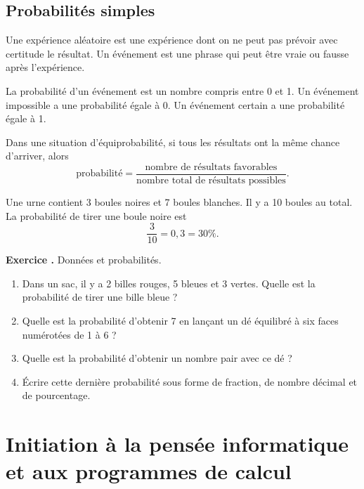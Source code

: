 \documentclass[11pt,a4paper]{article}
\newcounter{exo}
\newcommand{\exercice}[1]{\refstepcounter{exo}\begin{exobox}\textbf{Exercice \theexo.} #1\end{exobox}}
\begin{document}
\subsection{Probabilités simples}

\begin{definitionbox}
Une expérience aléatoire est une expérience dont on ne peut pas prévoir avec certitude le résultat. Un événement est une phrase qui peut être vraie ou fausse après l'expérience.
\end{definitionbox}

\begin{definitionbox}
La probabilité d'un événement est un nombre compris entre 0 et 1. Un événement impossible a une probabilité égale à 0. Un événement certain a une probabilité égale à 1.
\end{definitionbox}

\begin{proprbox}
Dans une situation d'équiprobabilité, si tous les résultats ont la même chance d'arriver, alors
\[
\text{probabilité}=\frac{\text{nombre de résultats favorables}}{\text{nombre total de résultats possibles}}.
\]
\end{proprbox}

\begin{exemplebox}
Une urne contient 3 boules noires et 7 boules blanches. Il y a 10 boules au total. La probabilité de tirer une boule noire est
\[
\frac{3}{10}=0,3=30\%.
\]
\end{exemplebox}

\exercice{Données et probabilités.
\begin{enumerate}[label=\alph*)]
\item Dans un sac, il y a 2 billes rouges, 5 bleues et 3 vertes. Quelle est la probabilité de tirer une bille bleue ?
\item Quelle est la probabilité d'obtenir 7 en lançant un dé équilibré à six faces numérotées de 1 à 6 ?
\item Quelle est la probabilité d'obtenir un nombre pair avec ce dé ?
\item Écrire cette dernière probabilité sous forme de fraction, de nombre décimal et de pourcentage.
\end{enumerate}}

\section{Initiation à la pensée informatique et aux programmes de calcul}
\end{document}
